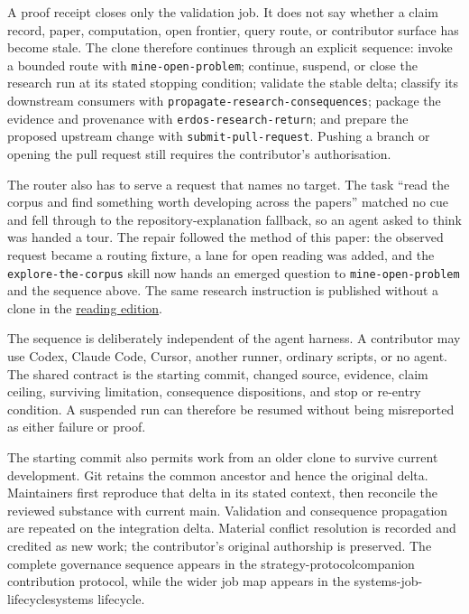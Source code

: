 \documentclass[11pt]{article}
\newcommand{\repobase}{https://github.com/wcook04/plectis-erdos}
\begin{document}
A proof receipt closes only the validation job. It does not say whether a
claim record, paper, computation, open frontier, query route, or contributor
surface has become stale. The clone therefore continues through an explicit
sequence: invoke a bounded route with \texttt{mine-open-problem}; continue,
suspend, or close the research run at its stated stopping condition; validate
the stable delta; classify its downstream consumers with
\texttt{propagate-research-consequences}; package the evidence and provenance
with \texttt{erdos-research-return}; and prepare the proposed upstream change
with \texttt{submit-pull-request}. Pushing a branch or opening the pull request
still requires the contributor's authorisation.

The router also has to serve a request that names no target.  The task
``read the corpus and find something worth developing across the papers''
matched no cue and fell through to the repository-explanation fallback, so an
agent asked to think was handed a tour.  The repair followed the method of
this paper: the observed request became a routing fixture, a lane for open
reading was added, and the \texttt{explore-the-corpus} skill now hands an
emerged question to \texttt{mine-open-problem} and the sequence above.  The
same research instruction is published without a clone in the
\href{\repobase/blob/main/docs/reading-edition/README.md}{reading edition}.

The sequence is deliberately independent of the agent harness. A contributor
may use Codex, Claude Code, Cursor, another runner, ordinary scripts, or no
agent. The shared contract is the starting commit, changed source, evidence,
claim ceiling, surviving limitation, consequence dispositions, and stop or
re-entry condition. A suspended run can therefore be resumed without being
misreported as either failure or proof.

The starting commit also permits work from an older clone to survive current
development. Git retains the common ancestor and hence the original delta.
Maintainers first reproduce that delta in its stated context, then reconcile
the reviewed substance with current main. Validation and consequence
propagation are repeated on the integration delta. Material conflict
resolution is recorded and credited as new work; the contributor's original
authorship is preserved. The complete governance sequence appears in the
%
{strategy-protocol}{companion contribution protocol}, while the wider job map
appears in the
%
{systems-job-lifecycle}{systems lifecycle}.
\end{document}
